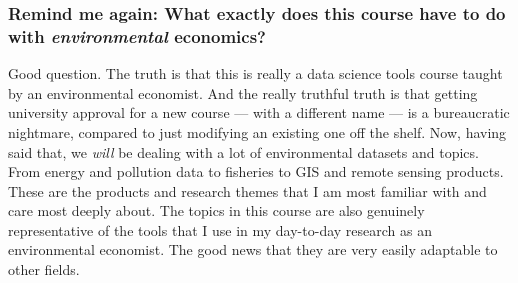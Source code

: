 \documentclass[12]{article}
\begin{document}
\vspace{-0.25cm}
\subsubsection*{Remind me again: What exactly does this course have to do with \textit{environmental} economics?}
Good question. The truth is that this is really a data science tools course taught by an environmental economist. And the really truthful truth is that getting university approval for a new course --- with a different name --- is a bureaucratic nightmare, compared to just modifying an existing one off the shelf. Now, having said that, we \textit{will} be dealing with a lot of environmental datasets and topics. From energy and pollution data to fisheries to GIS and remote sensing products. These are the products and research themes that I am most familiar with and care most deeply about. The topics in this course are also genuinely representative of the tools that I use in my day-to-day research as an environmental economist. The good news that they are very easily adaptable to other fields.
\end{document}
